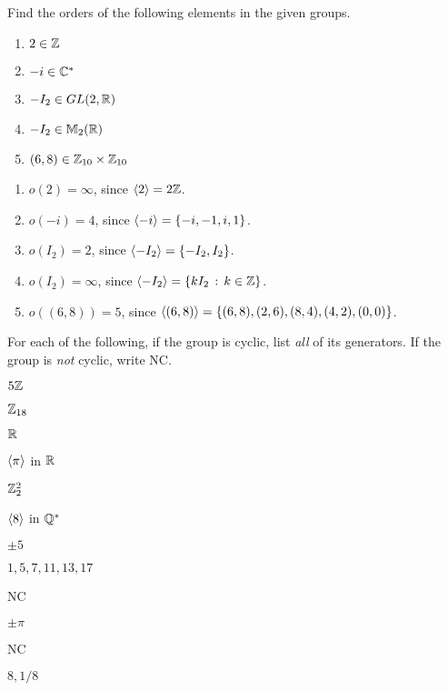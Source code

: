 \begin{exercise}
Find the orders of the following elements in the given groups.

\begin{enumerate}
\item $2\in \mathbb{Z}$
\item $-i\in \mathbb{C}^*$
\item $-I_2\in GL(2,\mathbb{R})$
\item $-I_2\in \mathbb{M}_2(\mathbb{R})$
\item $(6,8)\in \mathbb{Z}_{10}\times \mathbb{Z}_{10}$
\end{enumerate}
\end{exercise}

\begin{solution}[print=false]
\begin{enumerate}
\item $o(2)=\infty$, since $\langle2\rangle=2\mathbb{Z}$.
\item $o(-i)=4$, since $\langle-i\rangle=\{-i,-1,i,1\}$.
\item $o(I_2)=2$, since $\langle-I_2\rangle=\{-I_2,I_2\}$.
\item $o(I_2)=\infty$, since $\langle-I_2\rangle=\{kI_2\,:\,k\in \mathbb{Z}\}$.
\item $o((6,8))=5$, since $\langle(6,8)\rangle=\{(6,8),(2,6),(8,4),(4,2),(0,0)\}$.
\end{enumerate}
\end{solution}

\begin{exercise}
For each of the following, if the group is cyclic, list \textit{all} of its generators. If the group is \textit{not} cyclic, write NC.

\medskip

\noindent
\begin{inparaenum}[(a)]
\item $5\mathbb{Z}$ \hfill
\item $\mathbb{Z}_{18}$ \hfill
\item $\mathbb{R}$ \hfill
\item $\langle\pi\rangle$ in $\mathbb{R}$ \hfill
\item $\mathbb{Z}_2^2$ \hfill
\item $\langle8\rangle$ in $\mathbb{Q}^*$
\end{inparaenum}

\end{exercise}

\begin{solution}[print=false]

\begin{inparaenum}[(a)]
\item $\pm 5$ \hfill
\item $1,5,7,11,13,17$ \hfill
\item NC \hfill
\item $\pm \pi$ \hfill
\item NC \hfill
\item $8,1/8$
\end{inparaenum}

\end{solution}



